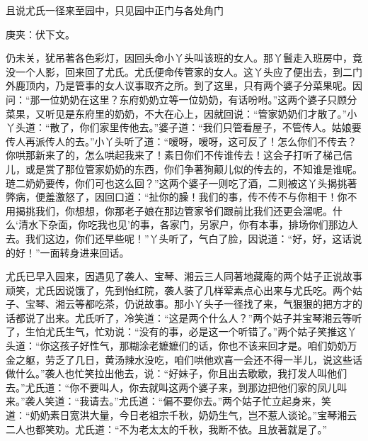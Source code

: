\begin{parag}
    且说尤氏一径来至园中，只见园中正门与各处角门\begin{note}庚夹：伏下文。\end{note}仍未关，犹吊著各色彩灯，因回头命小丫头叫该班的女人。那丫鬟走入班房中，竟没一个人影，回来回了尤氏。尤氏便命传管家的女人。这丫头应了便出去，到二门外鹿顶内，乃是管事的女人议事取齐之所。到了这里，只有两个婆子分菜果呢。因问：“那一位奶奶在这里？东府奶奶立等一位奶奶，有话吩咐。”这两个婆子只顾分菜果，又听见是东府里的奶奶，不大在心上，因就回说：“管家奶奶们才散了。”小丫头道：“散了，你们家里传他去。”婆子道：“我们只管看屋子，不管传人。姑娘要传人再派传人的去。”小丫头听了道：“嗳呀，嗳呀，这可反了！怎么你们不传去？你哄那新来了的，怎么哄起我来了！素日你们不传谁传去！这会子打听了梯己信儿，或是赏了那位管家奶奶的东西，你们争著狗颠儿似的传去的，不知谁是谁呢。琏二奶奶要传，你们可也这么回？”这两个婆子一则吃了酒，二则被这丫头揭挑著弊病，便羞激怒了，因回口道：“扯你的臊！我们的事，传不传不与你相干！你不用揭挑我们，你想想，你那老子娘在那边管家爷们跟前比我们还更会溜呢。什么‘清水下杂面，你吃我也见’的事，各家门，另家户，你有本事，排场你们那边人去。我们这边，你们还早些呢！”丫头听了，气白了脸，因说道：“好，好，这话说的好！”一面转身进来回话。
\end{parag}


\begin{parag}
    尤氏已早入园来，因遇见了袭人、宝琴、湘云三人同著地藏庵的两个姑子正说故事顽笑，尤氏因说饿了，先到怡红院，袭人装了几样荤素点心出来与尤氏吃。两个姑子、宝琴、湘云等都吃茶，仍说故事。那小丫头子一径找了来，气狠狠的把方才的话都说了出来。尤氏听了，冷笑道：“这是两个什么人？”两个姑子并宝琴湘云等听了，生怕尤氏生气，忙劝说：“没有的事，必是这一个听错了。”两个姑子笑推这丫头道：“你这孩子好性气，那糊涂老嬷嬷们的话，你也不该来回才是。咱们奶奶万金之躯，劳乏了几日，黄汤辣水没吃，咱们哄他欢喜一会还不得一半儿，说这些话做什么。”袭人也忙笑拉出他去，说：“好妹子，你且出去歇歇，我打发人叫他们去。”尤氏道：“你不要叫人，你去就叫这两个婆子来，到那边把他们家的凤儿叫来。”袭人笑道：“我请去。”尤氏道：“偏不要你去。”两个姑子忙立起身来，笑道：“奶奶素日宽洪大量，今日老祖宗千秋，奶奶生气，岂不惹人谈论。”宝琴湘云二人也都笑劝。尤氏道：“不为老太太的千秋，我断不依。且放著就是了。”
\end{parag}


